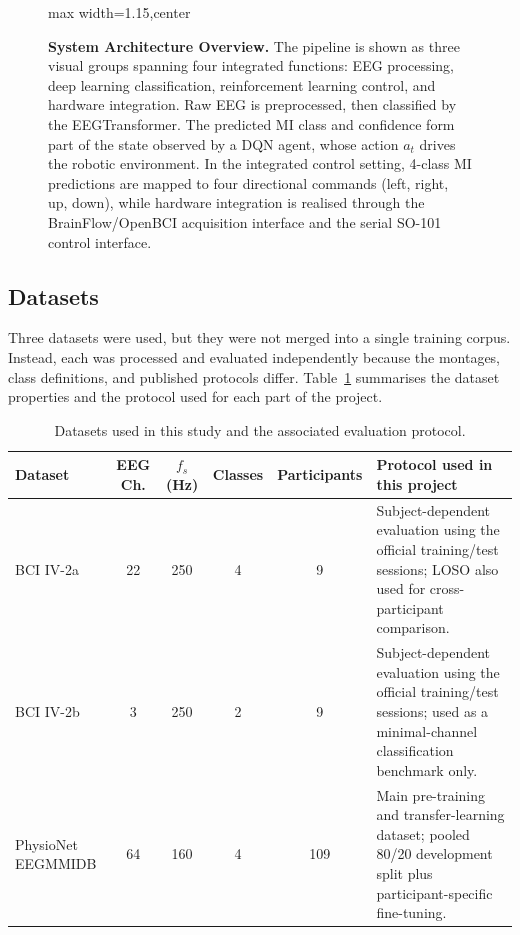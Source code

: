 \documentclass[12pt, a4paper]{article}
\begin{document}
\begin{figure}[htbp]
\begin{adjustbox}{max width=1.15\textwidth,center}
    \end{adjustbox}
    \caption{\textbf{System Architecture Overview.} The pipeline is shown as three visual groups spanning four integrated functions: EEG processing, deep learning classification, reinforcement learning control, and hardware integration. Raw EEG is preprocessed, then classified by the EEGTransformer. The predicted MI class and confidence form part of the state observed by a DQN agent, whose action $a_t$ drives the robotic environment. In the integrated control setting, 4-class MI predictions are mapped to four directional commands (left, right, up, down), while hardware integration is realised through the BrainFlow/OpenBCI acquisition interface and the serial SO-101 control interface.}
    \label{fig:system_overview}
\end{figure}

\subsection{Datasets}

Three datasets were used, but they were not merged into a single training corpus. Instead, each was processed and evaluated independently because the montages, class definitions, and published protocols differ. Table~\ref{tab:datasets_v10} summarises the dataset properties and the protocol used for each part of the project.

\begin{table}[htbp]
\centering
\caption{Datasets used in this study and the associated evaluation protocol.}
\label{tab:datasets_v10}
\begin{tabular}{@{} >{\raggedright\arraybackslash}p{2.5cm} c c c c >{\raggedright\arraybackslash}p{4.3cm} @{}}
\toprule
\textbf{Dataset} & \textbf{EEG Ch.} & \textbf{$f_s$ (Hz)} & \textbf{Classes} & \textbf{Participants} & \textbf{Protocol used in this project} \\
\midrule
BCI IV-2a & 22 & 250 & 4 & 9 & Subject-dependent evaluation using the official training/test sessions; LOSO also used for cross-participant comparison. \\
BCI IV-2b & 3 & 250 & 2 & 9 & Subject-dependent evaluation using the official training/test sessions; used as a minimal-channel classification benchmark only. \\
PhysioNet EEGMMIDB & 64 & 160 & 4 & 109 & Main pre-training and transfer-learning dataset; pooled 80/20 development split plus participant-specific fine-tuning. \\
\bottomrule
\end{tabular}
\end{table}
\end{document}
